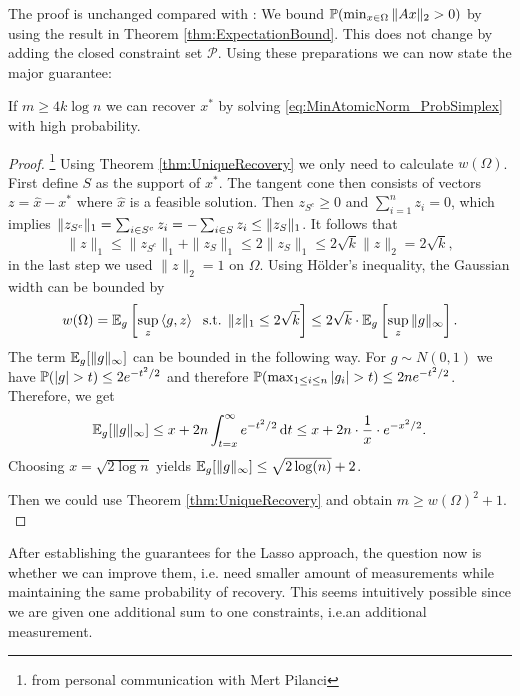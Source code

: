 \documentclass{article} %
\begin{document}
 The proof is unchanged compared with \cite{inverse_problems}: We bound $\P(\min_{x\in \Omega} \|A x\|_2 >0)$ by using the result in Theorem \ref{thm:ExpectationBound}. This does not change by adding the closed constraint set $\mathcal P$. Using these preparations we can now state the major guarantee:
\begin{theorem}
If $m\geq 4k\log n$ we can recover $x^*$ by solving \eqref{eq:MinAtomicNorm_ProbSimplex} with high probability.
\end{theorem}
\begin{proof}
\footnote{from personal communication with Mert Pilanci}
Using Theorem \ref{thm:UniqueRecovery} we only need to calculate $w(\Omega)$. First define $S$ as the support of $x^*$. The tangent cone then consists of vectors $z = \hat{x} - x^*$ where $\hat{x}$ is a feasible solution. Then $z_{S^c} \geq 0$ and $\sum_{i=1}^n z_i = 0$, which implies $\|z_{S^c}\|_1 = \sum_{i\in S^c} z_i = -\sum_{i\in S} z_i \leq \norm{z_S}_1$. It follows that
\begin{equation*}
\|z\|_1 \leq \|z_{S^c}\|_1  +\|z_S\|_1 \leq 2 \|z_S\|_1 \leq 2\sqrt{k} \|z\|_2 = 2\sqrt{k},
\end{equation*} 
in the last step we used $\|z\|_2=1$ on $\Omega$. Using H\"older's inequality, the Gaussian width can be bounded by
\begin{equation}
w(\Omega) = \EE_g \left[ \sup_{z}\, \sprod{g, z} \:\:  \text{ s.t. } \|z\|_1 \leq 2\sqrt{k} \right] \leq 2\sqrt k\cdot \E_g \left[\sup_z\,\norm{g}_\infty\right].
\end{equation}
The term $\E_g[\norm{g}_\infty]$ can be bounded in the following way.
For $g\sim N(0, 1)$ we have $\P(|g|>t) \leq 2e^{-t^2/2}$ and therefore $\P(\max_{1\leq i\leq n} |g_i| > t) \leq 2ne^{-t^2/2}$. Therefore, we get
\begin{equation*}
  \E_g[\norm{g}_\infty] \leq x + 2n\int_{t=x}^\infty e^{-t^2/2}\,\d t
  \leq x + 2n\cdot \frac 1 x \cdot e^{-x^2/2}.
\end{equation*}
Choosing $x = \sqrt{2\log n}$ yields $\E_g[\norm{g}_\infty] \leq
\sqrt{2\log(n)} + 2$.

Then we could use Theorem \ref{thm:UniqueRecovery} and obtain $m\geq  w(\Omega)^2 + 1$.\\
\end{proof}

After establishing the guarantees for the Lasso approach, the question now is whether we can improve them, i.e. need smaller amount of measurements while maintaining the same probability of recovery. This seems intuitively possible since we are given one additional sum to one constraints, i.e.an additional measurement. 
\end{document}
